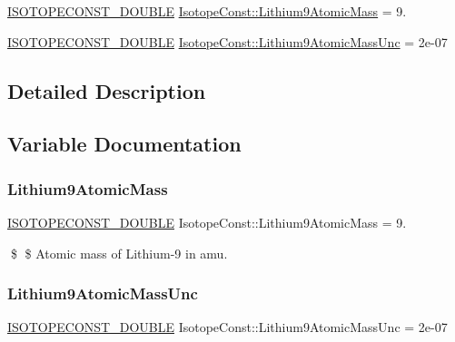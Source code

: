 \begin{DoxyCompactItemize}
\item 
\mbox{\hyperlink{group___isotope_const-_macros_ga8f45a7272ce02c0b4c65c44636ed719a}{I\+S\+O\+T\+O\+P\+E\+C\+O\+N\+S\+T\+\_\+\+D\+O\+U\+B\+LE}} \mbox{\hyperlink{group___isotope_const-_lithium-_li9_gad921b60220166e64427f37960893985b}{Isotope\+Const\+::\+Lithium9\+Atomic\+Mass}} = 9.
\item 
\mbox{\hyperlink{group___isotope_const-_macros_ga8f45a7272ce02c0b4c65c44636ed719a}{I\+S\+O\+T\+O\+P\+E\+C\+O\+N\+S\+T\+\_\+\+D\+O\+U\+B\+LE}} \mbox{\hyperlink{group___isotope_const-_lithium-_li9_ga7fd92b3fe7636a01bb763abc2908060c}{Isotope\+Const\+::\+Lithium9\+Atomic\+Mass\+Unc}} = 2e-\/07
\end{DoxyCompactItemize}


\subsection{Detailed Description}


\subsection{Variable Documentation}
\mbox{\label{group___isotope_const-_lithium-_li9_gad921b60220166e64427f37960893985b}} 
\subsubsection{\texorpdfstring{Lithium9\+Atomic\+Mass}{Lithium9AtomicMass}}
{\footnotesize\ttfamily \mbox{\hyperlink{group___isotope_const-_macros_ga8f45a7272ce02c0b4c65c44636ed719a}{I\+S\+O\+T\+O\+P\+E\+C\+O\+N\+S\+T\+\_\+\+D\+O\+U\+B\+LE}} Isotope\+Const\+::\+Lithium9\+Atomic\+Mass = 9.}

\$ \$ Atomic mass of Lithium-\/9 in amu. \mbox{\label{group___isotope_const-_lithium-_li9_ga7fd92b3fe7636a01bb763abc2908060c}} 
\subsubsection{\texorpdfstring{Lithium9\+Atomic\+Mass\+Unc}{Lithium9AtomicMassUnc}}
{\footnotesize\ttfamily \mbox{\hyperlink{group___isotope_const-_macros_ga8f45a7272ce02c0b4c65c44636ed719a}{I\+S\+O\+T\+O\+P\+E\+C\+O\+N\+S\+T\+\_\+\+D\+O\+U\+B\+LE}} Isotope\+Const\+::\+Lithium9\+Atomic\+Mass\+Unc = 2e-\/07}

